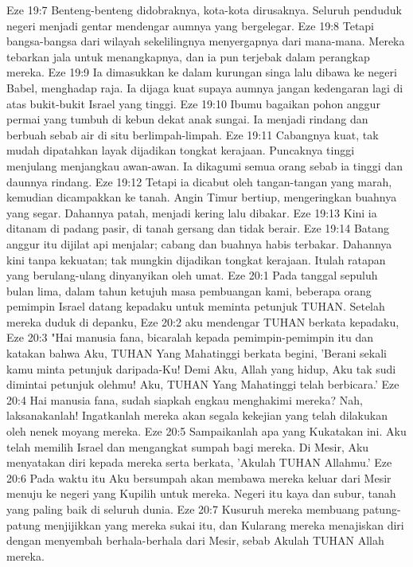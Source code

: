Eze 19:7  Benteng-benteng didobraknya, kota-kota dirusaknya. Seluruh penduduk negeri menjadi gentar mendengar aumnya yang bergelegar.
Eze 19:8  Tetapi bangsa-bangsa dari wilayah sekelilingnya menyergapnya dari mana-mana. Mereka tebarkan jala untuk menangkapnya, dan ia pun terjebak dalam perangkap mereka.
Eze 19:9  Ia dimasukkan ke dalam kurungan singa lalu dibawa ke negeri Babel, menghadap raja. Ia dijaga kuat supaya aumnya jangan kedengaran lagi di atas bukit-bukit Israel yang tinggi.
Eze 19:10  Ibumu bagaikan pohon anggur permai yang tumbuh di kebun dekat anak sungai. Ia menjadi rindang dan berbuah sebab air di situ berlimpah-limpah.
Eze 19:11  Cabangnya kuat, tak mudah dipatahkan layak dijadikan tongkat kerajaan. Puncaknya tinggi menjulang menjangkau awan-awan. Ia dikagumi semua orang sebab ia tinggi dan daunnya rindang.
Eze 19:12  Tetapi ia dicabut oleh tangan-tangan yang marah, kemudian dicampakkan ke tanah. Angin Timur bertiup, mengeringkan buahnya yang segar. Dahannya patah, menjadi kering lalu dibakar.
Eze 19:13  Kini ia ditanam di padang pasir, di tanah gersang dan tidak berair.
Eze 19:14  Batang anggur itu dijilat api menjalar; cabang dan buahnya habis terbakar. Dahannya kini tanpa kekuatan; tak mungkin dijadikan tongkat kerajaan. Itulah ratapan yang berulang-ulang dinyanyikan oleh umat.
Eze 20:1  Pada tanggal sepuluh bulan lima, dalam tahun ketujuh masa pembuangan kami, beberapa orang pemimpin Israel datang kepadaku untuk meminta petunjuk TUHAN. Setelah mereka duduk di depanku,
Eze 20:2  aku mendengar TUHAN berkata kepadaku,
Eze 20:3  "Hai manusia fana, bicaralah kepada pemimpin-pemimpin itu dan katakan bahwa Aku, TUHAN Yang Mahatinggi berkata begini, 'Berani sekali kamu minta petunjuk daripada-Ku! Demi Aku, Allah yang hidup, Aku tak sudi dimintai petunjuk olehmu! Aku, TUHAN Yang Mahatinggi telah berbicara.'
Eze 20:4  Hai manusia fana, sudah siapkah engkau menghakimi mereka? Nah, laksanakanlah! Ingatkanlah mereka akan segala kekejian yang telah dilakukan oleh nenek moyang mereka.
Eze 20:5  Sampaikanlah apa yang Kukatakan ini. Aku telah memilih Israel dan mengangkat sumpah bagi mereka. Di Mesir, Aku menyatakan diri kepada mereka serta berkata, 'Akulah TUHAN Allahmu.'
Eze 20:6  Pada waktu itu Aku bersumpah akan membawa mereka keluar dari Mesir menuju ke negeri yang Kupilih untuk mereka. Negeri itu kaya dan subur, tanah yang paling baik di seluruh dunia.
Eze 20:7  Kusuruh mereka membuang patung-patung menjijikkan yang mereka sukai itu, dan Kularang mereka menajiskan diri dengan menyembah berhala-berhala dari Mesir, sebab Akulah TUHAN Allah mereka.
